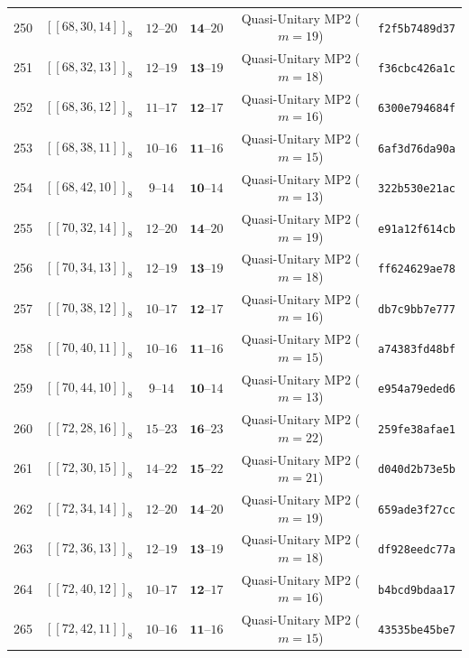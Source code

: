 \documentclass[11pt,a4paper]{article}
\theoremstyle{remark}
\begin{document}
{\begin{longtable}{@{}rccccl@{}}
250 & $[[68,30,14]]_{8}$ & $12\text{--}20$ & $\mathbf{14}\text{--}20$ & Quasi-Unitary MP2 ($m=19$) & \texttt{f2f5b7489d37} \\
251 & $[[68,32,13]]_{8}$ & $12\text{--}19$ & $\mathbf{13}\text{--}19$ & Quasi-Unitary MP2 ($m=18$) & \texttt{f36cbc426a1c} \\
252 & $[[68,36,12]]_{8}$ & $11\text{--}17$ & $\mathbf{12}\text{--}17$ & Quasi-Unitary MP2 ($m=16$) & \texttt{6300e794684f} \\
253 & $[[68,38,11]]_{8}$ & $10\text{--}16$ & $\mathbf{11}\text{--}16$ & Quasi-Unitary MP2 ($m=15$) & \texttt{6af3d76da90a} \\
254 & $[[68,42,10]]_{8}$ & $9\text{--}14$ & $\mathbf{10}\text{--}14$ & Quasi-Unitary MP2 ($m=13$) & \texttt{322b530e21ac} \\
255 & $[[70,32,14]]_{8}$ & $12\text{--}20$ & $\mathbf{14}\text{--}20$ & Quasi-Unitary MP2 ($m=19$) & \texttt{e91a12f614cb} \\
256 & $[[70,34,13]]_{8}$ & $12\text{--}19$ & $\mathbf{13}\text{--}19$ & Quasi-Unitary MP2 ($m=18$) & \texttt{ff624629ae78} \\
257 & $[[70,38,12]]_{8}$ & $10\text{--}17$ & $\mathbf{12}\text{--}17$ & Quasi-Unitary MP2 ($m=16$) & \texttt{db7c9bb7e777} \\
258 & $[[70,40,11]]_{8}$ & $10\text{--}16$ & $\mathbf{11}\text{--}16$ & Quasi-Unitary MP2 ($m=15$) & \texttt{a74383fd48bf} \\
259 & $[[70,44,10]]_{8}$ & $9\text{--}14$ & $\mathbf{10}\text{--}14$ & Quasi-Unitary MP2 ($m=13$) & \texttt{e954a79eded6} \\
260 & $[[72,28,16]]_{8}$ & $15\text{--}23$ & $\mathbf{16}\text{--}23$ & Quasi-Unitary MP2 ($m=22$) & \texttt{259fe38afae1} \\
261 & $[[72,30,15]]_{8}$ & $14\text{--}22$ & $\mathbf{15}\text{--}22$ & Quasi-Unitary MP2 ($m=21$) & \texttt{d040d2b73e5b} \\
262 & $[[72,34,14]]_{8}$ & $12\text{--}20$ & $\mathbf{14}\text{--}20$ & Quasi-Unitary MP2 ($m=19$) & \texttt{659ade3f27cc} \\
263 & $[[72,36,13]]_{8}$ & $12\text{--}19$ & $\mathbf{13}\text{--}19$ & Quasi-Unitary MP2 ($m=18$) & \texttt{df928eedc77a} \\
264 & $[[72,40,12]]_{8}$ & $10\text{--}17$ & $\mathbf{12}\text{--}17$ & Quasi-Unitary MP2 ($m=16$) & \texttt{b4bcd9bdaa17} \\
265 & $[[72,42,11]]_{8}$ & $10\text{--}16$ & $\mathbf{11}\text{--}16$ & Quasi-Unitary MP2 ($m=15$) & \texttt{43535be45be7} \\

\end{longtable}}
\end{document}
